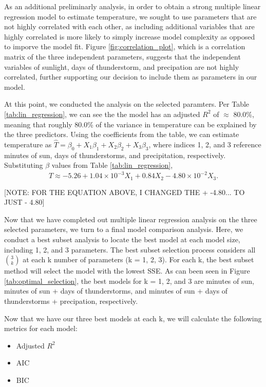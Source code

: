 As an additional preliminarly analysis, in order to obtain a strong multiple linear regression model to estimate temperature, we sought to use parameters that are not highly correlated with each other, as including additional variables that are highly correlated is more likely to simply increase model complexity as opposed to imporve the model fit. Figure \ref{fig:correlation_plot}, which is a correlation matrix of the three independent parameters, suggests that the independent variables of sunlight, days of thunderstorm, and precipation are not highly correlated, further supporting our decision to include them as parameters in our model.

At this point, we conducted the analysis on the selected paramters. Per Table \ref{tab:lin_regression}, we can see the the model has an adjusted $R^{2}$ of $\approx$ 80.0\%, meaning that roughly 80.0\% of the variance in temperature can be explained by the three predictors. Using the coefficients from the table, we can estimate temperature as $\hat{T} = \beta_{0} + X_{1}\beta_{1} + X_{2}\beta_{2} + X_{3}\beta_{3}$, where indices 1, 2, and 3 reference minutes of sun, days of thunderstorms, and precipitation, respectively. Substituting $\beta$ values from Table \ref{tab:lin_regression}, $$\hat{T} \approx -5.26 + 1.04 \times 10^{-3}X_{1} + 0.84X_{2} - 4.80\times 10^{-2}X_{3}.$$

[NOTE: FOR THE EQUATION ABOVE, I CHANGED THE + -4.80... TO JUST - 4.80]

Now that we have completed out multiple linear regression analysis on the three selected parameters, we turn to a final model comparison analysis. Here, we conduct a best subset analysis to locate the best model at each model size, including 1, 2, and 3 parameters. The best subset selection process considers all $3 \choose k$ at each k number of parameters (k = 1, 2, 3). For each k, the best subset method will select the model with the lowest SSE. As can been seen in Figure \ref{tab:optimal_selection}, the best models for k = 1, 2, and 3 are minutes of sun, minutes of sun + days of thunderstorms, and minutes of sun + days of thunderstorms + precipation, respectively.

Now that we have our three best models at each k, we will calculate the following metrics for each model: 

\begin{itemize}
	\item Adjusted $R^{2}$
	\item AIC
	\item BIC
\end{itemize}

